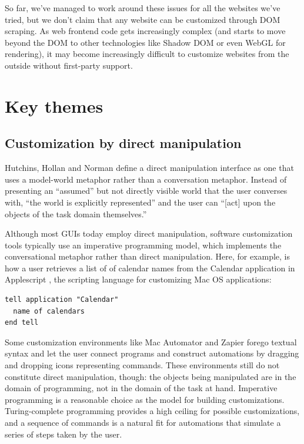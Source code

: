 \documentclass[sigplan,screen,10pt,anonymous,review]{acmart}
\begin{document}
So far, we've managed to work around these issues for all the websites
we've tried, but we don't claim that any website can be customized
through DOM scraping. As web frontend code gets increasingly complex
(and starts to move beyond the DOM to other technologies like Shadow DOM
or even WebGL for rendering), it may become increasingly difficult to
customize websites from the outside without first-party support.

\hypertarget{sec:themes}{%
\section{Key themes}\label{sec:themes}}

\hypertarget{sec:dm}{%
\subsection{Customization by direct manipulation}\label{sec:dm}}

Hutchins, Hollan and Norman \citep{hutchins1985} define a direct
manipulation interface as one that uses a model-world metaphor rather
than a conversation metaphor. Instead of presenting an ``assumed'' but
not directly visible world that the user converses with, ``the world is
explicitly represented'' and the user can ``{[}act{]} upon the objects
of the task domain themselves.''

Although most GUIs today employ direct manipulation, software
customization tools typically use an imperative programming model, which
implements the conversational metaphor rather than direct manipulation.
Here, for example, is how a user retrieves a list of of calendar names
from the Calendar application in Applescript \citep{cook2007}, the
scripting language for customizing Mac OS applications:

\begin{verbatim}
tell application "Calendar"
  name of calendars
end tell
\end{verbatim}

Some customization environments like Mac Automator and Zapier forego
textual syntax and let the user connect programs and construct
automations by dragging and dropping icons representing commands. These
environments still do not constitute direct manipulation, though: the
objects being manipulated are in the domain of programming, not in the
domain of the task at hand. Imperative programming is a reasonable
choice as the model for building customizations. Turing-complete
programming provides a high ceiling for possible customizations, and a
sequence of commands is a natural fit for automations that simulate a
series of steps taken by the user.
\end{document}
